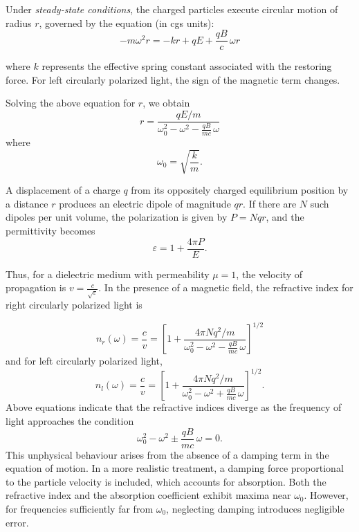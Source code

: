 Under \emph{steady-state conditions}, the charged particles execute circular motion of radius $r$, governed by the equation (in cgs units):
\begin{equation}
- m \omega^2 r = - k r + qE + \frac{qB}{c}\,\omega r
\end{equation}

where $k$ represents the effective spring constant associated with the restoring force. For left circularly polarized light, the sign of the magnetic term changes.

Solving the above equation for $r$, we obtain
\begin{equation}
r = \frac{qE/m}{\omega_0^2 - \omega^2 - \frac{qB}{mc}\,\omega}
\end{equation}
where
\begin{equation}
\omega_0 = \sqrt{\frac{k}{m}}.
\end{equation}

A displacement of a charge $q$ from its oppositely charged equilibrium position by a distance $r$ produces an electric dipole of magnitude $qr$. If there are $N$ such dipoles per unit volume, the polarization is given by $P = Nqr$, and the permittivity becomes
\[
\varepsilon = 1 + \frac{4\pi P}{E}.
\]

Thus, for a dielectric medium with permeability $\mu = 1$, the velocity of propagation is $v = \frac{c}{\sqrt{\varepsilon}}$. In the presence of a magnetic field, the refractive index for right circularly polarized light is

\begin{equation}
n_r(\omega) = \frac{c}{v} = \left[ 1 + \frac{4\pi N q^2 / m}{\omega_0^2 - \omega^2 - \frac{qB}{mc}\,\omega} \right]^{1/2}
\end{equation}
and for left circularly polarized light,
\begin{equation}
n_l(\omega) = \frac{c}{v} = \left[ 1 + \frac{4\pi N q^2 / m}{\omega_0^2 - \omega^2 + \frac{qB}{mc}\,\omega} \right]^{1/2}.
\end{equation}
Above equations indicate that the refractive indices diverge as the frequency of light approaches the condition
\[
\omega_0^2 - \omega^2 \pm \frac{qB}{mc}\,\omega = 0.
\]
This unphysical behaviour arises from the absence of a damping term in the equation of motion. In a more realistic treatment, a damping force proportional to the particle velocity is included, which accounts for absorption. Both the refractive index and the absorption coefficient exhibit maxima near $\omega_0$. However, for frequencies sufficiently far from $\omega_0$, neglecting damping introduces negligible error.

